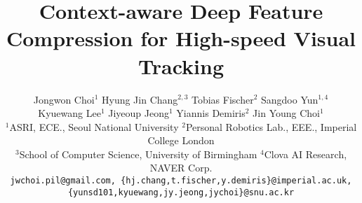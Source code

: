 \documentclass[10pt,twocolumn,letterpaper]{article}
\begin{document}
\begin{acronym}[TRACA] 
\end{acronym}


\title{Context-aware Deep Feature Compression for High-speed Visual Tracking}
\vspace{-3cm}
\author{Jongwon Choi$^1$ \quad Hyung Jin Chang$^{2,3}$ \quad Tobias Fischer$^2$ \quad Sangdoo Yun$^{1,4}$ \\ Kyuewang Lee$^1$ \quad Jiyeoup Jeong$^1$ \quad Yiannis Demiris$^2$ \quad Jin Young Choi$^1$\\
{\small \hspace{1cm}$^1$ASRI, ECE., Seoul National University}
{\small \hspace{1cm}$^2$Personal Robotics Lab., EEE., Imperial College London}\\
{\small \hspace{-1.5cm}$^3$School of Computer Science, University of Birmingham}
{\small \hspace{1.5cm}$^4$Clova AI Research, NAVER Corp.}\\
{\tt\scriptsize jwchoi.pil@gmail.com, \{hj.chang,t.fischer,y.demiris\}@imperial.ac.uk, \{yunsd101,kyuewang,jy.jeong,jychoi\}@snu.ac.kr}
}

\maketitle
\thispagestyle{empty}

\end{document}
